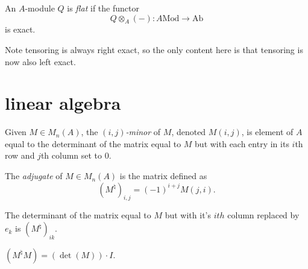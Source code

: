 \documentclass[12pt]{article}
\begin{document}
\begin{definition}
	An $A$-module $Q$ is \emph{flat} if the functor
	\begin{equation*}
		Q\otimes_A (-): A\text{Mod}\to \text{Ab}
	\end{equation*}
	is exact.
\end{definition}

\begin{remark}
	Note tensoring is always right exact, so the only content here is that tensoring is now also left exact.
\end{remark}


\section{linear algebra} %

\begin{definition}
	Given $M\in M_n(A)$, the \emph{$(i,j)$-minor} of $M$, denoted $M(i,j)$, is element of $A$ equal to the determinant of the matrix equal to $M$ but with each entry in its $i$th row and $j$th column set to $0$.
\end{definition}

\begin{definition}
	The \emph{adjugate} of $M\in M_n(A)$ is the matrix defined as 
	\begin{equation*}
		(M^\natural)_{i,j} = (-1)^{i+j}M(j,i).
	\end{equation*}
\end{definition}

\begin{corollary}
	The determinant of the matrix equal to $M$ but with it's $ith$ column replaced by $e_k$ is $(M^\natural)_{ik}$.
\end{corollary}

\begin{corollary}
	$(M^\natural M) = (\det(M))\cdot I$.
\end{corollary}
\end{document}
